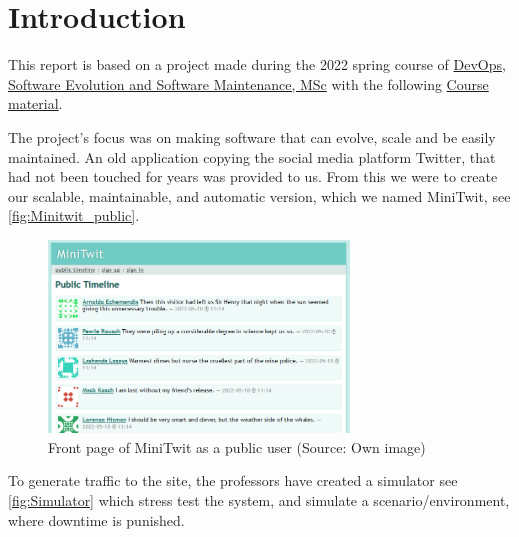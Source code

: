 \section{Introduction}
This report is based on a project made during the 2022 spring course of \href{https://learnit.itu.dk/local/coursebase/view.php?ciid=909}{DevOps, Software Evolution and Software Maintenance, MSc} with the following  \href{https://github.com/itu-devops/lecture_notes/tree/e44664f50c8b0ffb30a77a29e305df3f6750d5d4}{Course material}. 

The project's focus was on making software that can evolve, scale and be easily maintained. An old application copying the social media platform Twitter, that had not been touched for years was provided to us. From this we were to create our scalable, maintainable, and automatic version, which we named MiniTwit, see \autoref{fig:Minitwit_public}.

\begin{figure}[!ht]
    \centering
    \captionsetup{justification=centering,margin=1cm}
    \includegraphics[width=80mm]{images/introduction/minitwitFrontPage.png}
    \caption{Front page of MiniTwit as a public user (Source: Own image)}
    \label{fig:Minitwit_public}
\end{figure}

To generate traffic to the site, the professors have created a simulator see \autoref{fig:Simulator} which stress test the system, and simulate a scenario/environment, where downtime is punished. 

